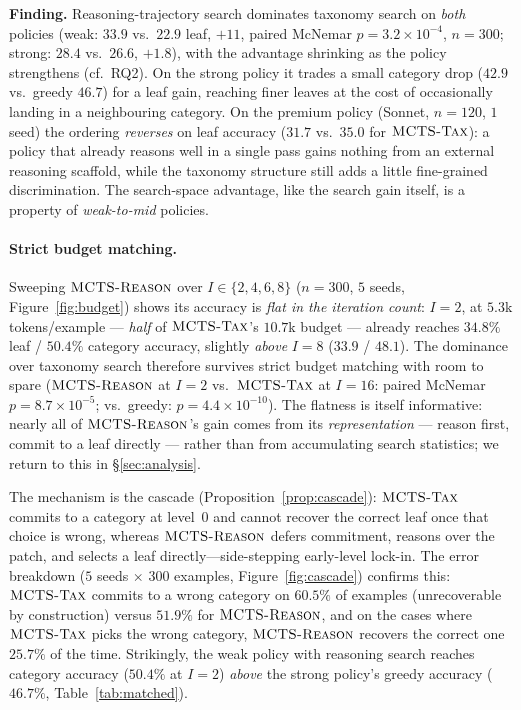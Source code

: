\textbf{Finding.} Reasoning-trajectory search dominates taxonomy search on
\emph{both} policies (weak: $33.9$ vs.\ $22.9$ leaf, $+11$, paired McNemar
$p{=}3.2\!\times\!10^{-4}$, $n{=}300$; strong: $28.4$ vs.\ $26.6$, $+1.8$), with
the advantage shrinking as the policy strengthens (cf.\ RQ2). On the strong
policy it trades a small category drop ($42.9$ vs.\ greedy $46.7$) for a leaf
gain, reaching finer leaves at the cost of occasionally landing in a neighbouring
category. On the premium policy (Sonnet, $n{=}120$, $1$ seed) the ordering
\emph{reverses} on leaf accuracy ($31.7$ vs.\ $35.0$ for $\textsc{MCTS-Tax}$): a policy
that already reasons well in a single pass gains nothing from an external
reasoning scaffold, while the taxonomy structure still adds a little fine-grained
discrimination. The search-space advantage, like the search gain itself, is a
property of \emph{weak-to-mid} policies.

\paragraph{Strict budget matching.}
Sweeping $\textsc{MCTS-Reason}$ over $I \in \{2,4,6,8\}$ ($n{=}300$, $5$ seeds,
Figure~\ref{fig:budget}) shows its accuracy is \emph{flat in the iteration count}:
$I{=}2$, at $5.3$k tokens/example --- \emph{half} of $\textsc{MCTS-Tax}$'s $10.7$k budget
--- already reaches $34.8\%$ leaf / $50.4\%$ category accuracy, slightly
\emph{above} $I{=}8$ ($33.9$ / $48.1$). The dominance over taxonomy search
therefore survives strict budget matching with room to spare ($\textsc{MCTS-Reason}$ at
$I{=}2$ vs.\ $\textsc{MCTS-Tax}$ at $I{=}16$: paired McNemar $p{=}8.7\!\times\!10^{-5}$;
vs.\ greedy: $p{=}4.4\!\times\!10^{-10}$). The flatness is itself informative:
nearly all of $\textsc{MCTS-Reason}$'s gain comes from its \emph{representation} --- reason
first, commit to a leaf directly --- rather than from accumulating search
statistics; we return to this in \S\ref{sec:analysis}.

The mechanism is the cascade (Proposition~\ref{prop:cascade}): $\textsc{MCTS-Tax}$ commits
to a category at level~0 and cannot recover the correct leaf once that choice is
wrong, whereas $\textsc{MCTS-Reason}$ defers commitment, reasons over the patch, and selects
a leaf directly---side-stepping early-level lock-in. The error breakdown ($5$
seeds $\times$ $300$ examples, Figure~\ref{fig:cascade}) confirms this:
$\textsc{MCTS-Tax}$ commits to a wrong category on $60.5\%$ of examples (unrecoverable by
construction) versus $51.9\%$ for $\textsc{MCTS-Reason}$, and on the cases where $\textsc{MCTS-Tax}$
picks the wrong category, $\textsc{MCTS-Reason}$ recovers the correct one $25.7\%$ of the
time. Strikingly, the weak policy with reasoning search reaches category accuracy
($50.4\%$ at $I{=}2$) \emph{above} the strong policy's greedy accuracy ($46.7\%$,
Table~\ref{tab:matched}).

